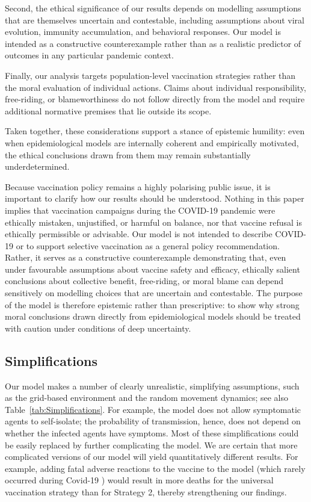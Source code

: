 \documentclass[a4paper,12pt]{article}
\begin{document}
Second, the ethical significance of our results depends on modelling assumptions that are themselves uncertain and contestable, including assumptions about viral evolution, immunity accumulation, and behavioral responses. Our model is intended as a constructive counterexample rather than as a realistic predictor of outcomes in any particular pandemic context.

Finally, our analysis targets population-level vaccination strategies rather than the moral evaluation of individual actions. Claims about individual responsibility, free-riding, or blameworthiness do not follow directly from the model and require additional normative premises that lie outside its scope.

Taken together, these considerations support a stance of epistemic humility: even when epidemiological models are internally coherent and empirically motivated, the ethical conclusions drawn from them may remain substantially underdetermined.

Because vaccination policy remains a highly polarising public issue, it is important to clarify how our results should be understood. Nothing in this paper implies that vaccination campaigns during the COVID-19 pandemic were ethically mistaken, unjustified, or harmful on balance, nor that vaccine refusal is ethically permissible or advisable. Our model is not intended to describe COVID-19 or to support selective vaccination as a general policy recommendation. Rather, it serves as a constructive counterexample demonstrating that, even under favourable assumptions about vaccine safety and efficacy, ethically salient conclusions about collective benefit, free-riding, or moral blame can depend sensitively on modelling choices that are uncertain and contestable. The purpose of the model is therefore epistemic rather than prescriptive: to show why strong moral conclusions drawn directly from epidemiological models should be treated with caution under conditions of deep uncertainty.

\subsection{Simplifications}\label{subsec:Simple}
Our model makes a number of clearly unrealistic, simplifying assumptions, such as the grid-based environment and the random movement dynamics; see also Table~\ref{tab:Simplifications}. For example, the model does not allow symptomatic agents to self-isolate; the probability of transmission, hence, does not depend on whether the infected agents have symptoms. Most of these simplifications could be easily replaced by further complicating the model. We are certain that more complicated versions of our model will yield quantitatively different results. For example, adding fatal adverse reactions to the vaccine to the model (which rarely occurred during Covid-19 \cite{Sessa2021}) would result in more deaths for the universal vaccination strategy than for Strategy 2, thereby strengthening our findings.
\end{document}
